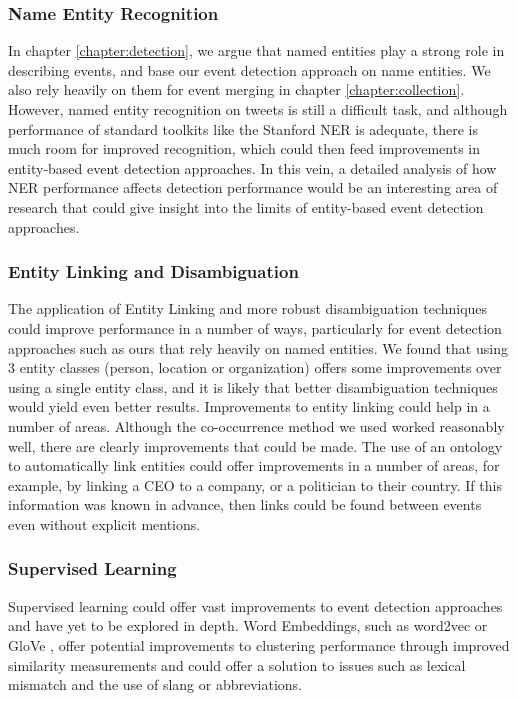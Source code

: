 \subsubsection{Name Entity Recognition}
In chapter \ref{chapter:detection}, we argue that named entities play a strong role in describing events, and base our event detection approach on name entities.
We also rely heavily on them for event merging in chapter \ref{chapter:collection}.
However, named entity recognition on tweets is still a difficult task, and although performance of standard toolkits like the Stanford NER is adequate, there is much room for improved recognition, which could then feed improvements
in entity-based event detection approaches.
In this vein, a detailed analysis of how NER performance affects detection performance would be an interesting area of research that could give insight into the limits of entity-based event detection approaches.

\subsubsection{Entity Linking and Disambiguation}
The application of Entity Linking and more robust disambiguation techniques could improve performance in a number of ways, particularly for event detection approaches such as ours that rely heavily on named entities.
We found that using 3 entity classes (person, location or organization) offers some improvements over using a single entity class, and it is likely that better disambiguation techniques would yield even better results.
Improvements to entity linking could help in a number of areas.
Although the co-occurrence method we used worked reasonably well, there are clearly improvements that could be made.
The use of an ontology to automatically link entities could offer improvements in a number of areas, for example, by linking a CEO to a company, or a politician to their country.
If this information was known in advance, then links could be found between events even without explicit mentions.

\subsubsection{Supervised Learning}
Supervised learning could offer vast improvements to event detection approaches and have yet to be explored in depth.
Word Embeddings, such as word2vec \citep{mikolov2013distributed} or GloVe \citep{pennington2014glove}, offer potential improvements  to clustering performance through improved similarity measurements and could offer a solution to issues such as lexical mismatch and the use of slang or abbreviations.

